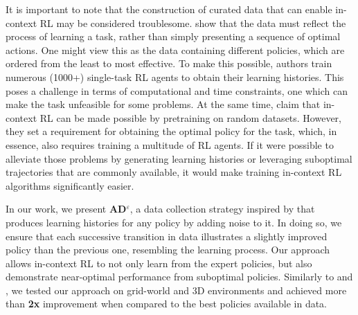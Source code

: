 \documentclass{article}
\theoremstyle{plain}
\theoremstyle{definition}
\theoremstyle{remark}
\begin{document}
It is important to note that the construction of curated data that can enable in-context RL may be considered troublesome. \citet{laskin2022context} show that the data must reflect the process of learning a task, rather than simply presenting a sequence of optimal actions. One might view this as the data containing different policies, which are ordered from the least to most effective. To make this possible, authors train numerous (1000+) single-task RL agents to obtain their learning histories. This poses a challenge in terms of computational and time constraints, one which can make the task unfeasible for some problems. At the same time, \citet{lee2023supervised} claim that in-context RL can be made possible by pretraining on random datasets. However, they set a requirement for obtaining the optimal policy for the task, which, in essence, also requires training a multitude of RL agents. If it were possible to alleviate those problems by generating learning histories or leveraging suboptimal trajectories that are commonly available, it would make training in-context RL algorithms significantly easier.



In our work, we present \textbf{AD$^\varepsilon$}, a data collection strategy inspired by \citet{brown2020better} that produces learning histories for any policy by adding noise to it. In doing so, we ensure that each successive transition in data illustrates a slightly improved policy than the previous one, resembling the learning process. Our approach allows in-context RL to not only learn from the expert policies, but also demonstrate near-optimal performance from suboptimal policies. Similarly to \citet{laskin2022context} and \citet{lee2023supervised}, we tested our approach on grid-world and 3D environments and achieved more than \textbf{2x} improvement when compared to the best policies available in data.

\end{document}
